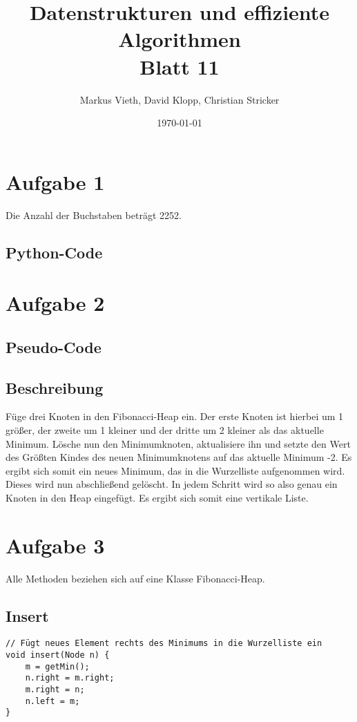 \documentclass[a4paper,11pt,twoside]{scrartcl}
\title{Datenstrukturen und effiziente Algorithmen\\ Blatt 11}
\author{Markus Vieth, David Klopp, Christian Stricker}
\date{\today}
\begin{document}
\maketitle
\cleardoublepage
\pagestyle{myheadings}

\section*{Aufgabe 1}
Die Anzahl der Buchstaben beträgt 2252.
\subsection*{Python-Code}


\section*{Aufgabe 2}

\subsection*{Pseudo-Code}


\subsection*{Beschreibung}
Füge drei Knoten in den Fibonacci-Heap ein. Der erste Knoten ist hierbei um 1 größer, der zweite um 1 kleiner und der dritte um 2 kleiner als das aktuelle Minimum. Lösche nun den Minimumknoten, aktualisiere ihn und setzte den Wert des Größten Kindes des neuen Minimumknotens auf das aktuelle Minimum -2. Es ergibt sich somit ein neues Minimum, das in die Wurzelliste aufgenommen wird. Dieses wird nun abschließend gelöscht. In jedem Schritt wird so also genau ein Knoten in den Heap eingefügt. Es ergibt sich somit eine vertikale Liste.


\section*{Aufgabe 3}
Alle Methoden beziehen sich auf eine Klasse Fibonacci-Heap.

\subsection*{Insert}
\begin{lstlisting}[style=c,basicstyle=\small\ttfamily]
// Fügt neues Element rechts des Minimums in die Wurzelliste ein
void insert(Node n) {
	m = getMin();
	n.right = m.right;
	m.right = n;
	n.left = m;
}
\end{lstlisting}
\end{document}
